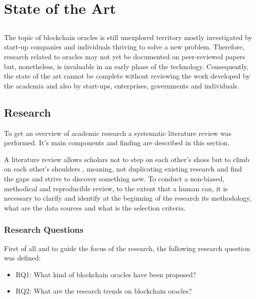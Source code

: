 \chapter{State of the Art} \label{chap:sota}

\section*{}



The topic of blockchain oracles is still unexplored territory mostly investigated by start-up companies and individuals thriving to solve a new problem. Therefore, research related to oracles may not yet be documented on peer-reviewed papers but, nonetheless, is invaluable in an early phase of the technology. Consequently, the state of the art cannot be complete without reviewing the work developed by the academia and also by start-ups, enterprises, governments and individuals.

\section{Research}

To get an overview of academic research a systematic literature review was performed. It's main components and finding are described in this section.

A literature review allows scholars not to step on each other's shoes but to climb on each other's shoulders \cite{Kitchenham2007GuidelinesEngineering}, meaning, not duplicating existing research and find the gaps and strive to discover something new. To conduct a non-biased, methodical and reproducible review, to the extent that a human can, it is necessary to clarify and identify at the beginning of the research its methodology, what are the data sources and what is the selection criteria.

\subsection{Research Questions}
First of all and to guide the focus of the research, the following research question was defined:
\begin{itemize}
  \item RQ1: What kind of blockchain oracles have been proposed?
  \item RQ2: What are the research trends on blockchain oracles?
\end{itemize}


